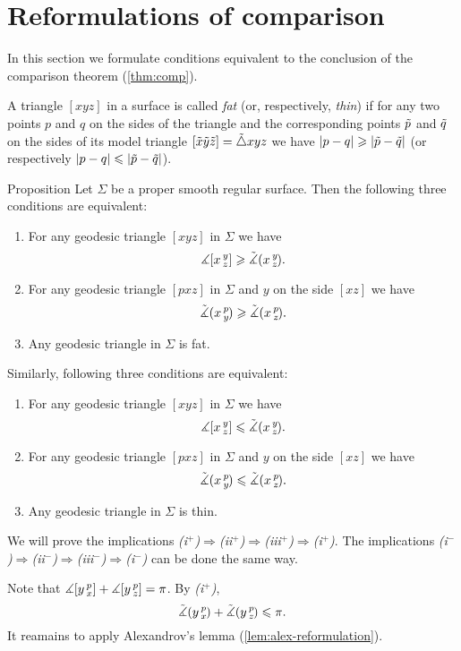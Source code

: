 \section*{Reformulations of comparison}

In this section we formulate conditions equivalent to the conclusion of the comparison theorem (\ref{thm:comp}).

A triangle $[xyz]$ in a surface is called \emph{fat} (or, respectively, \emph{thin})
if for any two points $p$ and $q$ on the sides of the triangle and the corresponding points 
$\~p$ and $\~q$ on the sides of its model triangle $[\~x\~y\~z]\z=\~\triangle xyz$ we have
$|p-q|\ge |\~p-\~q|$ (or respectively $|p-q|\le |\~p-\~q|$).


\begin{thm}{Proposition}\label{prop:comp-reformulations}
Let $\Sigma$ be a proper smooth regular surface.
Then the following three conditions are equivalent:
\begin{enumerate}[(i$^{+}$)]
\item For any geodesic triangle $[xyz]$ in $\Sigma$ we have
 \[\measuredangle\hinge {x}{y}{z}\ge\angk xyz.\]
\item For any geodesic triangle $[pxz]$ in $\Sigma$ and $y$ on the side $[xz]$ we have
 \[\angk xpy \ge \angk xpz.\]
\item Any geodesic triangle in $\Sigma$ is fat.
\end{enumerate}

\medskip

Similarly, following three conditions are equivalent:
\begin{enumerate}[(i$^{-}$)]
\item For any geodesic triangle $[xyz]$ in $\Sigma$ we have
 \[\measuredangle\hinge {x}{y}{z}\le\angk xyz.\]
\item For any geodesic triangle $[pxz]$ in $\Sigma$ and $y$ on the side $[xz]$ we have
 \[\angk xpy \le \angk xpz.\]
\item Any geodesic triangle in $\Sigma$ is thin.
\end{enumerate}

\end{thm}

 We will prove the implications \textit{(i$^{+}$)$\Rightarrow$(ii$^{+}$)$\Rightarrow$(iii$^{+}$)$\Rightarrow$(i$^{+}$)}.
The implications \textit{(i$^{-}$)$\Rightarrow$(ii$^{-}$)$\Rightarrow$(iii$^{-}$)$\Rightarrow$(i$^{-}$)} can be done the same way.

Note that $\measuredangle\hinge ypx+\measuredangle\hinge ypz=\pi$.
By \textit{(i$^{+}$)}, 
\[\angk ypx+\angk ypz\le \pi.\]
It reamains to apply Alexandrov's lemma (\ref{lem:alex-reformulation}).


